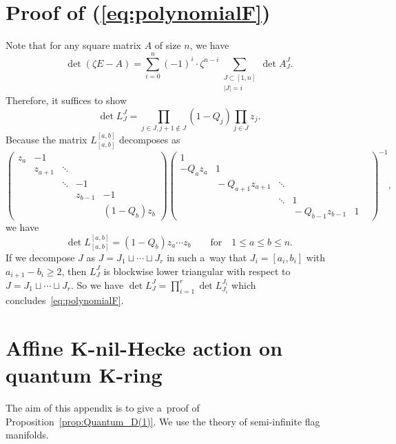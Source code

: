 \documentclass[10pt,a4paper]{amsart}
\numberwithin{equation}{section}
\theoremstyle{definition}
\begin{document}
\section{Proof of (\ref{eq:polynomialF})}
\label{sec:F}
Note that for any square matrix $A$ of size $n$, we have
\[
\det(\zeta E-A)=
\sum_{i=0}^n(-1)^i\cdot \zeta^{n-i}
\sum_{
\substack{
J\subset [1,n]\\
|J|=i
}
}
\det A_J^J.
\]
Therefore, it suffices to show
\[
\det L_J^J=
\prod_{j\in J,j+1\notin J}(1-Q_j)
\prod_{j\in J}z_j.
\]
Because the matrix $L^{[a,b]}_{[a,b]}$ decomposes as
\[
\begin{pmatrix}
z_a & -1 && & \\
 & z_{a+1}&\ddots& &\\
 & &\ddots& -1 &\\
 & &&\!z_{b-1}&-1\\
 &&&&\!\!\!\!\!(1-Q_b)z_b
\end{pmatrix}
\begin{pmatrix}
1 & & && & \\
-Q_az_a & 1 && & \\
 &\!\!\!\!\!\!\!-Q_{a+1}z_{a+1} &\ddots& &\\
 & & \ddots &1&\\
 &&&\!\!\!\!\!\!\!\!\!-Q_{b-1}z_{b-1}&1
\end{pmatrix}^{-1},
\]
we have
\[
\det L^{[a,b]}_{[a,b]}=
(1-Q_b)z_a\cdots z_b
\qquad
\text{for}\quad 1\le a\le b\le n.
\]
If we decompose
$J$ as
$J=J_1\sqcup \cdots\sqcup J_r$ in such a~way that
$J_i=[a_i,b_i]$
with $a_{i+1}-b_i\ge 2 $, then
$L_J^J$ is blockwise lower triangular with respect to
$J=J_1\sqcup \cdots\sqcup J_r$. So we have
$\det L_J^J
=\prod_{i=1}^r \det L_{J_i}^{J_i}$
which concludes~\eqref{eq:polynomialF}.

\section[Affine K-nil-Hecke action on quantum K-ring]{Affine $\boldsymbol{K}$-nil-Hecke action on quantum $\boldsymbol{ K}$-ring}\label{sec:nil-Hecke_on_QK}
The aim of this appendix is to give a~proof of Proposition~\ref{prop:Quantum_D(1)}. We use the theory of
semi-infinite flag manifolds.
\end{document}
